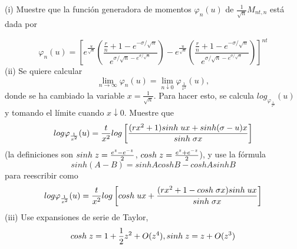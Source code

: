 \documentclass[11pt,notitlepage]{article}
\begin{document}
(i) Muestre que la función generadora de momentos $\varphi_{n}(u)$ de $\frac{1}{\sqrt{n}}M_{nt,n}$ está dada por

\begin{equation*}
    \varphi_{n}(u)=\left[ e^{\frac{u}{\sqrt{n}}}\left(\frac{\frac{r}{n}+1-e^{-\sigma/\sqrt{n}}}{e^{\sigma/\sqrt{n}-e^{\sigma/\sqrt{n}}}} \right) -e^{\frac{u}{\sqrt{n}}}\left( \frac{\frac{r}{n}+1-e^{-\sigma/\sqrt{n}}}{e^{\sigma/\sqrt{n}-e^{\sigma/\sqrt{n}}}} \right) \right]^{nt}
\end{equation*}
\hspace{0.4cm} (ii) Se quiere calcular
\begin{equation*}
    \lim_{n\rightarrow\infty}\varphi_{n}(u)=\lim_{n\downarrow0}\varphi_{\frac{1}{x^2}}(u),
\end{equation*}
\hspace{0.4cm} donde se ha cambiado la variable $x=\frac{1}{\sqrt{n}}.$ Para hacer esto, se
calcula $log_{\varphi_{\frac{1}{x^2}}}(u)$ y tomando el límite cuando $x\downarrow0$. Muestre que
\begin{equation*}
    log\varphi_{\frac{1}{x^2}}(u)=\frac{t}{x^2}log\left[ \frac{(rx^{2}+1)sinh \hspace{0.1cm}ux+sinh (\sigma-u)x}{sinh\hspace{0.1cm}\sigma x}\right]
\end{equation*}
\hspace{0.4cm} (la definiciones son $sinh \hspace{0.1cm}z=\frac{e^{z}-e^{-z}}{2}$, $cosh\hspace{0.1cm}z=\frac{e^{z}+e^{-z}}{2}$), y use la fórmula
\begin{equation*}
    sinh(A-B)=sinh A cosh B- cosh A sinh B
\end{equation*}
\hspace{0.4cm} para reescribir como
\begin{equation*}
    log\varphi_{\frac{1}{x^2}}(u)=\frac{t}{x^2}log\left[ cosh\hspace{0.1cm}ux+\frac{(rx^2+1-cosh\hspace{0.1cm}\sigma x)sinh\hspace{0.1cm}ux}{sinh \hspace{0.1cm}\sigma x} \right]
\end{equation*}
\hspace{0.4cm}(iii) Use expansiones de serie de Taylor,
\begin{equation*}
    cosh\hspace{0.1cm}z=1+\frac{1}{2}z^2+O(z^4), sinh \hspace{0.1cm}z=z+O(z^3)
\end{equation*}
\end{document}
